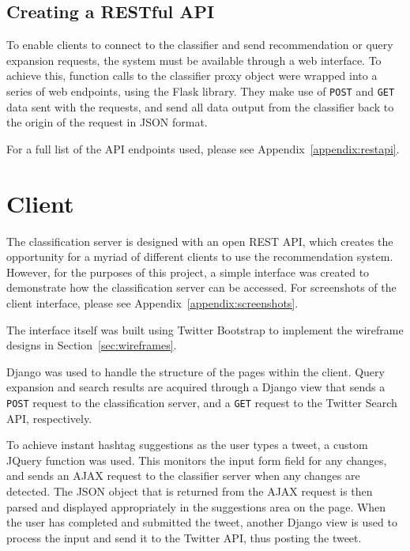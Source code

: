 \documentclass[11pt,a4paper]{report}
\begin{document}
\subsection{Creating a RESTful API}
To enable clients to connect to the classifier and send recommendation or query expansion requests, the system must be available through a web interface. To achieve this, function calls to the classifier proxy object were wrapped into a series of web endpoints, using the Flask library. They make use of \texttt{POST} and \texttt{GET} data sent with the requests, and send all data output from the classifier back to the origin of the request in JSON format.

For a full list of the API endpoints used, please see Appendix~\ref{appendix:restapi}.

\section{Client}
The classification server is designed with an open REST API, which creates the opportunity for a myriad of different clients to use the recommendation system. However, for the purposes of this project, a simple interface was created to demonstrate how the classification server can be accessed. For screenshots of the client interface, please see Appendix~\ref{appendix:screenshots}.

The interface itself was built using Twitter Bootstrap to implement the wireframe designs in Section~\ref{sec:wireframes}.

Django was used to handle the structure of the pages within the client. Query expansion and search results are acquired through a Django view that sends a \texttt{POST} request to the classification server, and a \texttt{GET} request to the Twitter Search API, respectively. 

To achieve instant hashtag suggestions as the user types a tweet, a custom JQuery function was used. This monitors the input form field for any changes, and sends an AJAX request to the classifier server when any changes are detected. The JSON object that is returned from the AJAX request is then parsed and displayed appropriately in the suggestions area on the page. When the user has completed and submitted the tweet, another Django view is used to process the input and send it to the Twitter API, thus posting the tweet.

\end{document}
